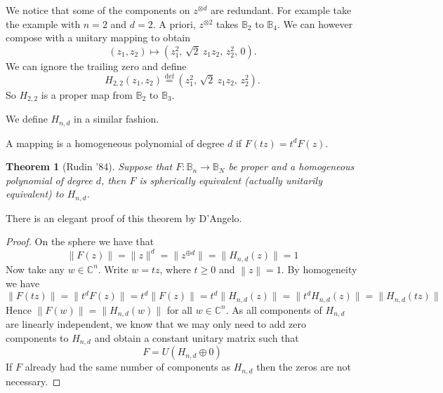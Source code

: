 \documentclass[12pt,openany]{book}
\newcommand{\norm}[1]{\left\lVert {#1} \right\rVert}
\newcommand{\smnorm}[1]{\lVert {#1} \rVert}
\newcommand{\C}{{\mathbb{C}}}
\newcommand{\bB}{{\mathbb{B}}}
\theoremstyle{plain}
\newtheorem{thm}{Theorem}[section]
\theoremstyle{remark}
\theoremstyle{definition}
\theoremstyle{exercise}
\theoremstyle{example}
\begin{document}
We notice that some of the components on $z^{\otimes d}$ are redundant.
For example take the example with $n=2$ and $d=2$.  A priori,
$z^{\otimes 2}$ takes $\bB_2$ to $\bB_4$.  We can however compose with 
a unitary mapping to obtain
\begin{equation}
(z_1,z_2) \mapsto
(z_1^2, \, \sqrt{2}~z_1z_2 , \, z_2^2, \, 0) .
\end{equation}
We can ignore the trailing zero and define
\begin{equation}
H_{2,2} (z_1,z_2) \overset{\mathrm{def}}{=} (z_1^2, \, \sqrt{2}~z_1z_2, \, z_2^2) .
\end{equation}
So $H_{2,2}$ is a proper map from $\bB_2$ to $\bB_3$.

We define $H_{n,d}$ in a similar fashion.

A mapping is a homogeneous polynomial of degree $d$ if $F(tz) = t^d F(z)$.

\begin{thm}[Rudin '84]
Suppose that $F \colon \bB_n \to \bB_N$ be
proper and a homogeneous polynomial of degree $d$, then $F$ is spherically
equivalent (actually unitarily equivalent) to $H_{n,d}$.
\end{thm}


There is an elegant proof of this theorem by D'Angelo.

\begin{proof}
On the sphere we have that
\begin{equation}
\smnorm{F(z)} = \smnorm{z}^d = \smnorm{z^{\oplus d}} = \smnorm{H_{n,d}(z)} = 1
\end{equation}
Now take any $w \in \C^n$.  Write $w = t z$, where $t \geq 0$ and
$\norm{z} = 1$.  By homogeneity we have
\begin{equation}
\smnorm{F(tz)} =
\smnorm{t^d F(z)} =
t^d \smnorm{F(z)}
= t^d \smnorm{H_{n,d}(z)}
= \smnorm{t^d H_{n,d}(z)}
= \smnorm{H_{n,d}(tz)}
\end{equation}
Hence $\smnorm{F(w)} = \smnorm{H_{n,d}(w)}$ for all $w \in \C^n$.  As all
components of $H_{n,d}$ are linearly independent, we know that we may only
need to add zero components to $H_{n,d}$ and obtain a constant unitary matrix such that
\begin{equation}
F = U ( H_{n,d} \oplus 0 )
\end{equation}
If $F$ already had the same number of components as $H_{n,d}$ then the zeros
are not necessary.
\end{proof}
\end{document}
